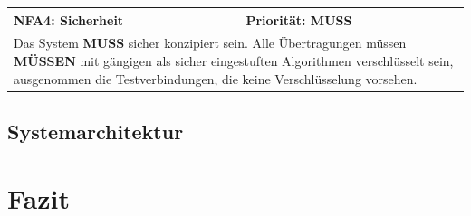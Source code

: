 \documentclass[titlepage]{report}
\begin{document}
\begin{center}
\begin{tabular}{p{}>{\raggedleft\arraybackslash}p{}}\toprule
    \textbf{NFA4: Sicherheit} & \textbf{Priorität: MUSS} \\\midrule
	\multicolumn{2}{p{\textwidth-\tabcolsep}}{%
        Das System \textbf{MUSS} sicher konzipiert sein.
        Alle Übertragungen müssen \textbf{MÜSSEN} mit gängigen
        als sicher eingestuften Algorithmen verschlüsselt sein,
        ausgenommen die Testverbindungen, die keine Verschlüsselung
        vorsehen.
        }\\\bottomrule
\end{tabular}
\end{center}
\section*{Systemarchitektur}
\chapter*{Fazit}
\nocite{*}
\printbibliography{}
\lstlistoflistings{}
\listoffigures
\printglossary{}
\end{document}
